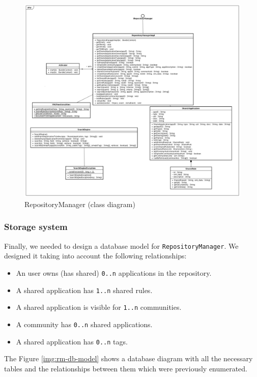 \begin{figure}[h!]
 \begin{center}
 \includegraphics[scale=0.31]{diagrams/RepositoryManagerClassDiagram.png}
  \caption{\label{img:rm-cd}RepositoryManager (class diagram)}
 \end{center}
\end{figure}

\subsubsection{Storage system}

Finally, we needed to design a database model for \verb|RepositoryManager|. We
designed it taking into account the following relationships:

\begin{itemize}
  \item An user owns (has shared) \verb|0..n| applications in the repository.
  \item A shared application has \verb|1..n| shared rules.
  \item A shared application is visible for \verb|1..n| communities.
  \item A community has \verb|0..n| shared applications.
  \item A shared application has \verb|0..n| tags.
\end{itemize}

The Figure \ref{img:rm-db-model} shows a database diagram with all the
necessary tables and the relationships between them which were previously
enumerated.


